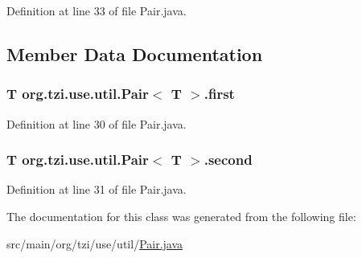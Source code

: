 Definition at line 33 of file Pair.\-java.



\subsection{Member Data Documentation}
\hypertarget{classorg_1_1tzi_1_1use_1_1util_1_1_pair_3_01_t_01_4_a6d2b6e30ccf375f314855b7eae2cd0ac}{
\subsubsection[{first}]{\setlength{\rightskip}{0pt plus 5cm}T org.\-tzi.\-use.\-util.\-Pair$<$ T $>$.first}}\label{classorg_1_1tzi_1_1use_1_1util_1_1_pair_3_01_t_01_4_a6d2b6e30ccf375f314855b7eae2cd0ac}


Definition at line 30 of file Pair.\-java.

\hypertarget{classorg_1_1tzi_1_1use_1_1util_1_1_pair_3_01_t_01_4_a9eccd9177d0d30dd9165a26e8e6e7858}{
\subsubsection[{second}]{\setlength{\rightskip}{0pt plus 5cm}T org.\-tzi.\-use.\-util.\-Pair$<$ T $>$.second}}\label{classorg_1_1tzi_1_1use_1_1util_1_1_pair_3_01_t_01_4_a9eccd9177d0d30dd9165a26e8e6e7858}


Definition at line 31 of file Pair.\-java.



The documentation for this class was generated from the following file\-:\begin{DoxyCompactItemize}
\item 
src/main/org/tzi/use/util/\hyperlink{_pair_8java}{Pair.\-java}\end{DoxyCompactItemize}
